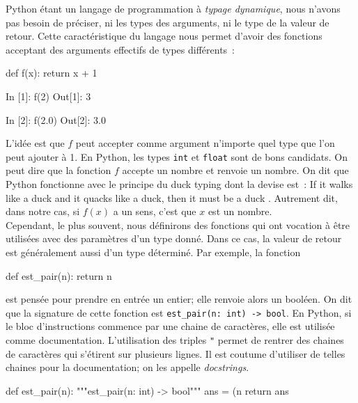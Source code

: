 \documentclass{magnolia}
\begin{document}
Python étant un langage de programmation à \emph{typage dynamique}, nous n'avons pas besoin de
préciser, ni les types des arguments, ni le type de la valeur de retour. Cette caractéristique
du langage nous permet d'avoir des fonctions acceptant des arguments effectifs de types différents~:

\begin{pythoncodeline}
def f(x):
    return x + 1
\end{pythoncodeline}

\begin{pythoncode}
In [1]: f(2)
Out[1]: 3

In [2]: f(2.0)
Out[2]: 3.0
\end{pythoncode}

\noindent
L'idée est que $f$ peut accepter comme argument n'importe quel type que l'on peut
ajouter à 1. En Python, les types \verb_int_ et \verb_float_ sont de bons
candidats. On peut dire que la fonction $f$ accepte un nombre et renvoie un nombre.
On dit que Python fonctionne avec le principe du \og duck typing \fg dont la devise est~:
\og If it walks like a duck and it quacks like a duck, then it must be a duck \fg. Autrement
dit, dans notre cas, si $f(x)$ a un sens, c'est que $x$ est un nombre.\\

Cependant, le plus souvent, nous définirons des fonctions qui ont vocation
à être utilisées avec des paramètres d'un type donné. Dans ce cas, la valeur
de retour est généralement aussi d'un type déterminé. Par exemple, la fonction

\begin{pythoncodeline}
def est_pair(n):
    return n %
\end{pythoncodeline}

\noindent
est pensée pour prendre en entrée un entier; elle renvoie alors un booléen. On dit que la signature
de cette fonction est \verb!est_pair(n: int) -> bool!. En Python, si le bloc
d'instructions commence par une chaine de caractères, elle est utilisée comme
documentation. L'utilisation des triples \verb_"_ permet 
de rentrer des chaines de caractères qui  s'étirent sur plusieurs lignes.
Il est coutume d'utiliser de telles chaines pour la documentation; on les appelle
\emph{docstrings}.

\begin{pythoncodeline}
def est_pair(n):
    """est_pair(n: int) -> bool"""
    ans = (n %
    return ans
\end{pythoncodeline}
\end{document}
